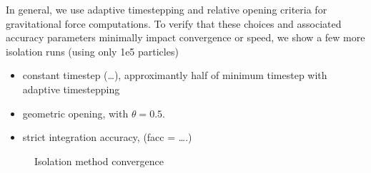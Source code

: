 In general, we use adaptive timestepping and relative opening criteria
for gravitational force computations. To verify that these choices and
associated accuracy parameters minimally impact convergence or speed, we
show a few more isolation runs (using only 1e5 particles)

\begin{itemize}
\tightlist
\item
  constant timestep (\ldots), approximantly half of minimum timestep
  with adaptive timestepping
\item
  geometric opening, with \(\theta = 0.5\).
\item
  strict integration accuracy, (facc = \ldots.)
\end{itemize}

\begin{figure}
\centering
{}
\caption{Isolation method convergence}\label{fig:methods_convergence}
\end{figure}
